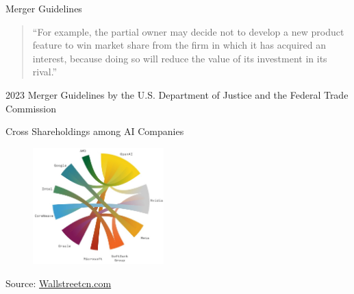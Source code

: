 \documentclass[
  10pt,
  aspectratio=169,   %
]{beamer}
\theoremstyle{plain}
\begin{document}
\begin{frame}{Merger Guidelines \hyperlink{intro}{}}
  \label{guidelines}
  \begin{quote}
    ``For example, \alert{the partial owner may decide not to develop a new product feature} to win market share from the firm in which it has acquired an interest, because doing so will reduce the value of its investment in its rival.''
  \end{quote}
  \medskip{}
  2023 Merger Guidelines by the U.S. Department of Justice and the Federal Trade Commission
\end{frame}

\begin{frame}{Cross Shareholdings among AI Companies \hyperlink{conclusion}{}}
  \label{ai}
  \begin{figure}
    \centering
    \includegraphics[width=0.45\textwidth]{figures/AI_circular.jpeg}
  \end{figure}
  {\footnotesize Source: \href{https://longbridge.com/en/news/260114348}{Wallstreetcn.com}}
\end{frame}
\end{document}
